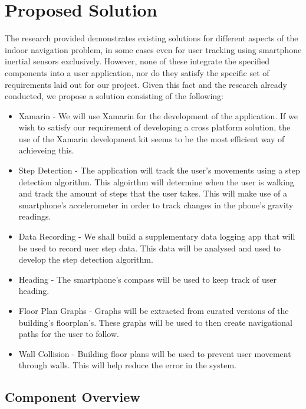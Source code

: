 \documentclass[main.tex]{subfiles}
\begin{document}
\chapter{Proposed Solution}

The research provided demonstrates existing solutions for different aspects of the indoor navigation problem, in some cases even for user tracking using smartphone inertial sensors exclusively. However, none of these integrate the specified components into a user application, nor do they satisfy the specific set of requirements laid out for our project. 
Given this fact and the research already conducted, we propose a solution consisting of the following:

\begin{itemize}

\item Xamarin - We will use Xamarin for the development of the application. If we wish to satisfy our requirement of developing a cross platform solution, the use of the Xamarin development kit seems to be the most efficient way of achieveing this.

\item Step Detection - The application will track the user's movements using a step detection algorithm. This algoirthm will determine when the user is walking and track the amount of steps that the user takes. This will make use of a smartphone's accelerometer in order to track changes in the phone's gravity readings.

\item Data Recording - We shall build a supplementary data logging app that will be used to record user step data. This data will be analysed and used to develop the step detection algorithm.

\item Heading - The smartphone's compass will be used to keep track of user heading.

\item Floor Plan Graphs - Graphs will be extracted from curated versions of the building's floorplan's. These graphs will be used to then create navigational paths for the user to follow.

\item Wall Collision - Building floor plans will be used to prevent user movement through walls. This will help reduce the error in the system.

\end{itemize}

\section{Component Overview}
\end{document}
